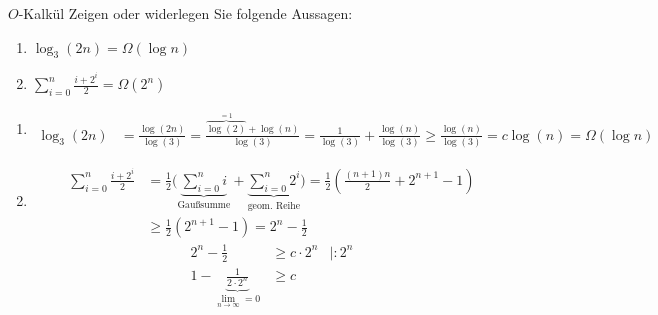 \documentclass[11pt,a4paper]{article}
\begin{document}
\begin{aufgabe}{2}{$O$-Kalkül}
    Zeigen oder widerlegen Sie folgende Aussagen:
    \begin{enumerate}
        \item $\log_3(2n) = \Omega(\log n)$
        \item $\sum\limits_{i=0}^n \frac{i + 2^i}{2} = \Omega(2^n)$
    \end{enumerate}
\end{aufgabe}
\begin{loesung}
    \begin{enumerate}
        \item 
        \begin{align*}
            \log_3(2n) &= \frac{\log(2n)}{\log(3)}
            = \frac{\overbrace{\log(2)}^{=1} + \log(n)}{\log(3)}
            = \frac{1}{\log(3)} + \frac{\log(n)}{\log(3)}
            \geq \frac{\log(n)}{\log(3)}
            = c \log(n) = \Omega(\log n)
        \end{align*}
        \item
        \begin{align*}
            \sum\limits_{i=0}^n \frac{i + 2^i}{2} 
            &= \frac{1}{2}\Bigg( \underbrace{\sum\limits_{i = 0}^n i}_{\text{Gaußsumme}} + \underbrace{\sum\limits_{i = 0}^n 2^i}_{\text{geom. Reihe}}\Bigg)
            = \frac{1}{2}\left(\frac{(n + 1)n}{2} + 2^{n + 1} - 1\right) \\
            &\geq \frac{1}{2} \left(2^{n + 1} - 1\right)
            = 2^n - \frac{1}{2}
        \end{align*}
        \begin{align*}
            2^n - \frac{1}{2}
            &\geq c \cdot 2^n
            & | : 2^n \\
            1 - \underbrace{\frac{1}{2 \cdot 2^n}}_{\lim\limits_{n \rightarrow \infty}=0} 
            &\geq c
        \end{align*}
    \end{enumerate}
\end{loesung}
\end{document}
